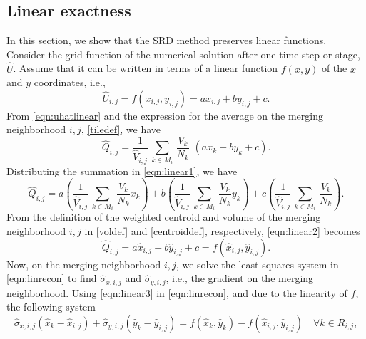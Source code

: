 \subsection{Linear exactness}
In this section, we show that the SRD method preserves linear functions.  Consider the grid function of the numerical solution after one time step or stage, $\widehat{U}$.  Assume that it can be written in terms of a linear function $f(x,y)$ of the $x$ and $y$ coordinates, i.e.,
\begin{equation}
    \label{eqn:uhatlinear}
\widehat{U}_{i,j} = f(x_{i,j},y_{i,j}) = ax_{i,j} + by_{i,j} + c.
\end{equation}
From \eqref{eqn:uhatlinear} and the expression for the average on the merging neighborhood $i,j$, \eqref{tiledef}, we have
\begin{equation}
    \label{eqn:linear1}
\widehat{Q}_{i,j} = \frac{1}{{\widehat V}_{i,j}} \, \sum_{k \in M_i} \,  
\frac{V_k}{N_k}  \,\, (ax_{k} + by_{k} + c).
\end{equation}
Distributing the summation in \eqref{eqn:linear1}, we have
\begin{equation}\label{eqn:linear2}
\widehat{Q}_{i,j} =  a \left(\frac{1}{{\widehat V}_{i,j}} \, \sum_{k \in M_i} \,  
\frac{V_k}{N_k} x_{k} \right) + b\left(\frac{1}{{\widehat V}_{i,j}} \, \sum_{k \in M_i} \,  
\frac{V_k}{N_k} y_{k} \right) + c\left(\frac{1}{{\widehat V}_{i,j}} \, \sum_{k \in M_i} \,
\frac{V_k}{N_k}\right) .
\end{equation}
From the definition of the weighted centroid and volume of the merging neighborhood
$i,j$ in \eqref{voldef} and \eqref{centroiddef}, respectively, \eqref{eqn:linear2} becomes
\begin{equation}\label{eqn:linear3}
\widehat{Q}_{i,j} =  a \widehat{x}_{i,j} + b\widehat{y}_{i,j} + c = f(\widehat{x}_{i,j},\widehat{y}_{i,j}).
\end{equation}
Now, on the merging neighborhood $i,j$, we solve the least squares system in
\eqref{eqn:linrecon} to find $\widehat{\sigma}_{x,i,j}$ and
$\widehat{\sigma}_{y,i,j}$, i.e., the gradient on the merging neighborhood.  Using
\eqref{eqn:linear3} in \eqref{eqn:linrecon}, and due to the linearity of $f$, the following system
\begin{equation}
\widehat{\sigma}_{x,i,j}(\widehat{x}_{k} - \widehat{x}_{i,j}) + \widehat{\sigma}_{y,i,j}(\widehat{y}_{k} - \widehat{y}_{i,j})= f(\widehat{x}_k, \widehat{y}_k) - f(\widehat{x}_{i,j}, \widehat{y}_{i,j}) \quad \forall k \in R_{i,j},
\end{equation}
